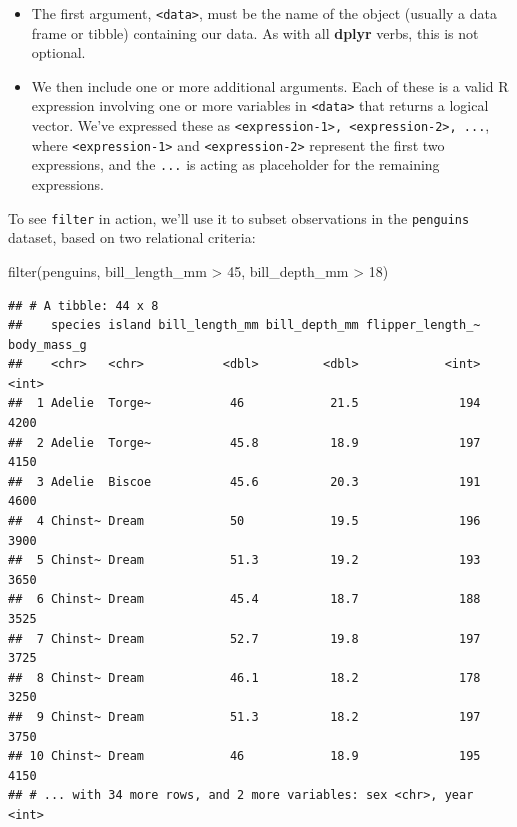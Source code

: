 \documentclass[
]{book}
\newenvironment{Shaded}{\begin{snugshade}}{\end{snugshade}}
\newcommand{\DecValTok}[1]{\textcolor[rgb]{0.00,0.00,0.81}{#1}}
\newcommand{\FunctionTok}[1]{\textcolor[rgb]{0.00,0.00,0.00}{#1}}
\newcommand{\NormalTok}[1]{#1}
\newcommand{\SpecialCharTok}[1]{\textcolor[rgb]{0.00,0.00,0.00}{#1}}
\providecommand{\tightlist}{%
  \setlength{\itemsep}{0pt}\setlength{\parskip}{0pt}}
\begin{document}
\begin{itemize}
\tightlist
\item
  The first argument, \texttt{\textless{}data\textgreater{}}, must be the name of the object (usually a data frame or tibble) containing our data. As with all \textbf{dplyr} verbs, this is not optional.
\item
  We then include one or more additional arguments. Each of these is a valid R expression involving one or more variables in \texttt{\textless{}data\textgreater{}} that returns a logical vector. We've expressed these as \texttt{\textless{}expression-1\textgreater{},\ \textless{}expression-2\textgreater{},\ ...}, where \texttt{\textless{}expression-1\textgreater{}} and \texttt{\textless{}expression-2\textgreater{}} represent the first two expressions, and the \texttt{...} is acting as placeholder for the remaining expressions.
\end{itemize}

To see \texttt{filter} in action, we'll use it to subset observations in the \texttt{penguins} dataset, based on two relational criteria:

\begin{Shaded}
\begin{Highlighting}[]
\FunctionTok{filter}\NormalTok{(penguins, bill\_length\_mm }\SpecialCharTok{\textgreater{}} \DecValTok{45}\NormalTok{, bill\_depth\_mm }\SpecialCharTok{\textgreater{}} \DecValTok{18}\NormalTok{)}
\end{Highlighting}
\end{Shaded}

\begin{verbatim}
## # A tibble: 44 x 8
##    species island bill_length_mm bill_depth_mm flipper_length_~ body_mass_g
##    <chr>   <chr>           <dbl>         <dbl>            <int>       <int>
##  1 Adelie  Torge~           46            21.5              194        4200
##  2 Adelie  Torge~           45.8          18.9              197        4150
##  3 Adelie  Biscoe           45.6          20.3              191        4600
##  4 Chinst~ Dream            50            19.5              196        3900
##  5 Chinst~ Dream            51.3          19.2              193        3650
##  6 Chinst~ Dream            45.4          18.7              188        3525
##  7 Chinst~ Dream            52.7          19.8              197        3725
##  8 Chinst~ Dream            46.1          18.2              178        3250
##  9 Chinst~ Dream            51.3          18.2              197        3750
## 10 Chinst~ Dream            46            18.9              195        4150
## # ... with 34 more rows, and 2 more variables: sex <chr>, year <int>
\end{verbatim}
\end{document}
